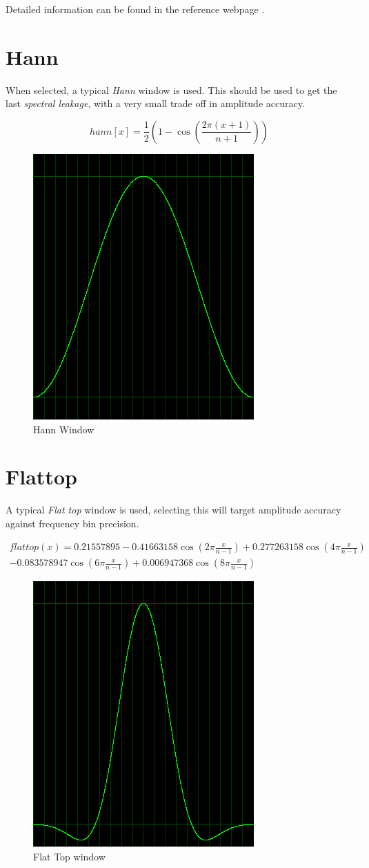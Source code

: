 \documentclass[10pt,a4paper]{report}
\begin{document}
\begin{appendices}
Detailed information can be found in the reference webpage \cite{tukey}.

\newpage
\section{Hann}
When selected, a typical \textit{Hann} window is used. This should be used to get the last \textit{spectral leakage}, with a very small trade off in amplitude accuracy.

\begin{equation}
hann[x] = \frac{1}{2}(1 - \cos(\frac{2\pi(x+1)}{n+1}))
\end{equation}

\begin{figure}[H]
	\centering
	\includegraphics[width=0.4\linewidth]{plots/window-hann.png}
	\caption[Hann Window]{Hann Window}
	\label{fig:window-hann}
\end{figure}

\newpage
\section{Flattop}
A typical \textit{Flat top} window is used, selecting this will target amplitude accuracy against frequency bin precision.

\begin{align*}
flattop(x)=0.21557895 - 0.41663158\cos(2\pi\frac{x}{n-1})+ 0.277263158\cos(4\pi\frac{x}{n-1})\\
- 0.083578947\cos(6\pi\frac{x}{n-1}) + 0.006947368\cos(8\pi\frac{x}{n-1})
\end{align*}

\begin{figure}[H]
	\centering
	\includegraphics[width=0.4\linewidth]{plots/window-flattop.png}
	\caption[Flat Top window]{Flat Top window}
	\label{fig:window-flattop}
\end{figure}


\end{appendices}
\end{document}
